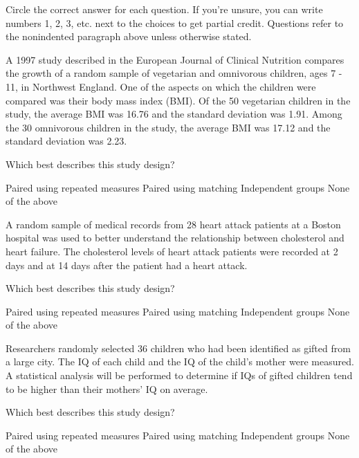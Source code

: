 \documentclass{article}
\begin{document}
	Circle the correct answer for each question.  If you're unsure, you can write numbers 1, 2, 3, etc. next to the choices to get partial credit.  Questions refer to the nonindented paragraph above unless otherwise stated.\\[.5cm]
	
	\begin{mcquestions}
		\question A 1997 study described in the European Journal of Clinical Nutrition compares the growth of a random sample of vegetarian and omnivorous children, ages 7 - 11, in Northwest England. One of the aspects on which the children were compared was their body mass index (BMI). Of the 50 vegetarian children in the study, the average BMI was 16.76 and the standard deviation was 1.91. Among the 30 omnivorous children in the study, the average BMI was 17.12 and the standard deviation was 2.23.
			
		Which best describes this study design?
		\begin{mcanswerslist}
			\answer Paired using repeated measures
			\answer Paired using matching
			\answer[correct] Independent groups
			\answer None of the above
		\end{mcanswerslist}
		
		\question A random sample of medical records from 28 heart attack patients at a Boston hospital was used to better understand the relationship between cholesterol and heart failure.  The cholesterol levels of heart attack patients were recorded at 2 days and at 14 days after the patient had a heart attack.
		
		Which best describes this study design?
		\begin{mcanswerslist}
			\answer[correct] Paired using repeated measures
			\answer Paired using matching
			\answer Independent groups
			\answer None of the above
		\end{mcanswerslist}
		
		\question Researchers randomly selected 36 children who had been identified as gifted from a large city. The IQ of each child and the IQ of the child's mother were measured. A statistical analysis will be performed to determine if IQs of gifted children tend to be higher than their mothers' IQ on average.
		
		Which best describes this study design?
		
		\begin{mcanswerslist}
			\answer Paired using repeated measures
			\answer[correct] Paired using matching
			\answer Independent groups
			\answer None of the above
		\end{mcanswerslist}
		
		
	\end{mcquestions}
\end{document}
